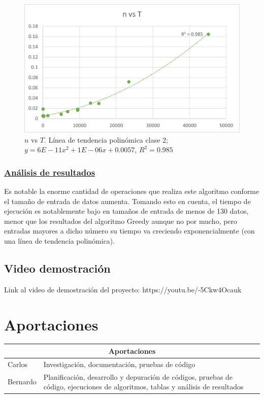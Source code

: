 \documentclass[12pt,letterpaper, titlepage, onecolumn]{article}
\begin{document}
			\begin{figure}[!]
				\centering
				\includegraphics{img/DP_nvsT.png}
				\caption{$n$ vs $T$. Línea de tendencia polinómica clase 2; $y = 6E-11x^2 + 1E-06x + 0.0057$, $R^2 = 0.985$}
			\end{figure}
			
		\pagebreak
		\subsubsection{\underline{Análisis de resultados}}
			\par Es notable la enorme cantidad de operaciones que realiza este algoritmo conforme el tamaño de entrada de datos aumenta. Tomando esto en cuenta, el tiempo de ejecución es notablemente bajo en tamaños de entrada de menos de 130 datos, menor que los resultados del algoritmo Greedy aunque no por mucho, pero entradas mayores a dicho número su tiempo va creciendo exponencialmente (con una línea de tendencia polinómica).
	\subsection{Video demostración}
		\par Link al video de demostración del proyecto: https://youtu.be/-5Ckw4Ocauk \\
		
\section{Aportaciones}
\begin{tabular}{ |p{3cm}|p{10cm}| }
	\hline
	\multicolumn{2}{|c|}{Aportaciones} \\
	\hline
	Carlos & Investigación, documentación, pruebas de código\\
	\hline
	Bernardo & Planificación, desarrollo y depuración de códigos, pruebas de código, ejecuciones de algoritmos, tablas y análisis de resultados\\
	\hline
\end{tabular}
\end{document}
